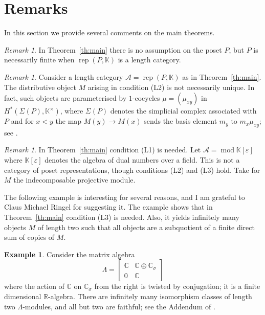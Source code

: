 \documentclass[a4paper]{amsart}
\theoremstyle{plain}
\theoremstyle{definition}
\newtheorem{exm}[thm]{Example}
\theoremstyle{remark}
\newtheorem{rem}[thm]{Remark}
\numberwithin{equation}{section}
\renewcommand{\mod}{\operatorname{mod}}
\newcommand{\rep}{\operatorname{rep}}
\def\A{\mathcal A}
\def\bbC{\mathbb C}
\def\bbK{\mathbb K}
\def\bbR{\mathbb R}
\def\e{\varepsilon}
\def\s{\sigma}
\def\La{\Lambda}
\begin{document}
\section{Remarks}

In this section we provide several comments on the main theorems.

\begin{rem}
In Theorem~\ref{th:main} there is no assumption on the poset $P$, but
$P$ is necessarily finite when $\rep(P,\bbK)$ is a length category.
\end{rem}

\begin{rem}
  Consider a length category $\A=\rep(P,\bbK)$ as in
  Theorem~\ref{th:main}. The distributive object $M$ arising in
  condition (L2) is not necessarily unique. In fact, such objects are
  parameterised by $1$-cocycles $\mu=(\mu_{xy})$ in
  $H^*(\Sigma(P),\bbK^{\times})$, where $\Sigma(P)$ denotes the
  simplicial complex associated with $P$ and for $x< y$ the map
  $M(y)\to M(x)$ sends the basis element $m_y$ to $m_x\mu_{xy}$; see
  \cite{GS1983, IK2022}.
\end{rem}

\begin{rem}
  In Theorem~\ref{th:main} condition (L1) is needed.  Let
  $\A=\mod \bbK[\e]$ where $\bbK[\e]$ denotes the algebra of dual
  numbers over a field. This is not a category of poset
  representations, though conditions (L2) and (L3) hold. Take for $M$
  the indecomposable projective module.
\end{rem}
  
The following example is interesting for several reasons, and I am
grateful to Claus Michael Ringel for suggesting it.  The example shows
that in Theorem~\ref{th:main} condition (L3) is needed. Also, it yields
infinitely many objects $M$ of length two such that all objects are a
subquotient of a finite direct sum of copies of $M$.

\begin{exm}
Consider the matrix algebra
\[\La=\begin{bmatrix}
    \bbC&\bbC\oplus\bbC_\s\\ 0&\bbC
  \end{bmatrix}\] where the action of $\bbC$ on $\bbC_\s$ from the
right is twisted by conjugation; it is a finite dimensional
$\bbR$-algebra.  There are infinitely many isomorphism classes of
length two $\La$-modules, and all but two are faithful; see the Addendum
of \cite{DR1976}.
\end{exm}
\end{document}

